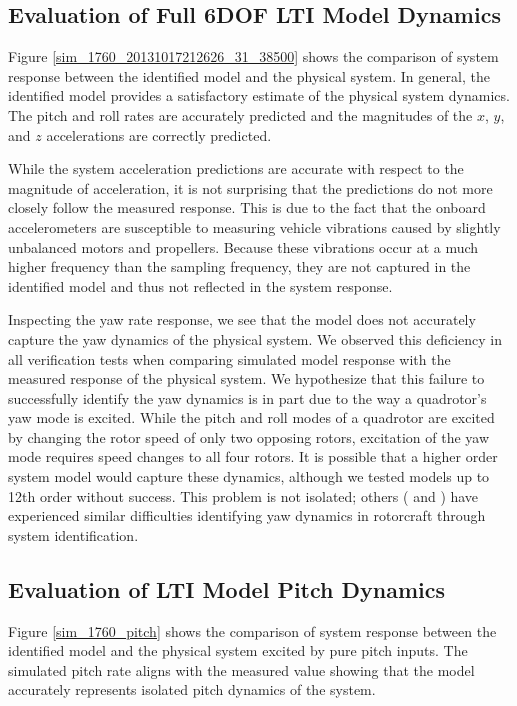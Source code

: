 \subsection{Evaluation of Full 6DOF LTI Model Dynamics}
Figure \ref{sim_1760_20131017212626_31_38500} shows the comparison of system response between the identified model and the physical system. In general, the identified model provides a satisfactory estimate of the physical system dynamics. The pitch and roll rates are accurately predicted and the magnitudes of the $x$, $y$, and $z$ accelerations are correctly predicted. 

While the system acceleration predictions are accurate with respect to the magnitude of acceleration, it is not surprising that the predictions do not more closely follow the measured response. This is due to the fact that the onboard accelerometers are susceptible to measuring vehicle vibrations caused by slightly unbalanced motors and propellers. Because these vibrations occur at a much higher frequency than the sampling frequency, they are not captured in the identified model and thus not reflected in the system response.

Inspecting the yaw rate response, we see that the model does not accurately capture the yaw dynamics of the physical system. We observed this deficiency in all verification tests when comparing simulated model response with the measured response of the physical system. We hypothesize that this failure to successfully identify the yaw dynamics is in part due to the way a quadrotor's yaw mode is excited. While the pitch and roll modes of a quadrotor are excited by changing the rotor speed of only two opposing rotors, excitation of the yaw mode requires speed changes to all four rotors. It is possible that a higher order system model would capture these dynamics, although we tested models up to 12th order without success. This problem is not isolated; others (\cite{lee2011attitude} and \cite{mettler2000system}) have experienced similar difficulties identifying yaw dynamics in rotorcraft through system identification.

\subsection{Evaluation of LTI Model Pitch Dynamics}
Figure \ref{sim_1760_pitch} shows the comparison of system response between the identified model and the physical system excited by pure pitch inputs. The simulated pitch rate aligns with the measured value showing that the model accurately represents isolated pitch dynamics of the system.


